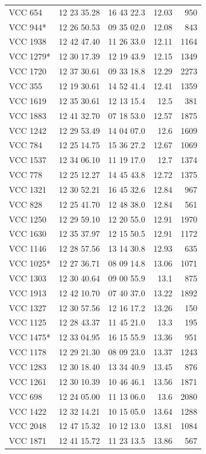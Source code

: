 \documentclass[12pt]{article}
\begin{document}
\begin{table}[!htp]
\begin{minipage}[t]{.45\linewidth}
\begin{tabular}{lrrrr}
VCC 654 &12 23 35.28 &16 43 22.3 &12.03 &950 \\
VCC 944* &12 26 50.53 &09 35 02.0 &12.08 &843 \\
VCC 1938 &12 42 47.40 &11 26 33.0 &12.11 &1164 \\
VCC 1279* &12 30 17.39 &12 19 43.9 &12.15 &1349 \\
VCC 1720 &12 37 30.61 &09 33 18.8 &12.29 &2273 \\
VCC 355 &12 19 30.61 &14 52 41.4 &12.41 &1359 \\
VCC 1619 &12 35 30.61 &12 13 15.4 &12.5 &381 \\
VCC 1883 &12 41 32.70 &07 18 53.0 &12.57 &1875 \\
VCC 1242 &12 29 53.49 &14 04 07.0 &12.6 &1609 \\
VCC 784 &12 25 14.75 &15 36 27.2 &12.67 &1069 \\
VCC 1537 &12 34 06.10 &11 19 17.0 &12.7 &1374 \\
VCC 778 &12 25 12.27 &14 45 43.8 &12.72 &1375 \\
VCC 1321 &12 30 52.21 &16 45 32.6 &12.84 &967 \\
VCC 828 &12 25 41.70 &12 48 38.0 &12.84 &561 \\
VCC 1250 &12 29 59.10 &12 20 55.0 &12.91 &1970 \\
VCC 1630 &12 35 37.97 &12 15 50.5 &12.91 &1172 \\
VCC 1146 &12 28 57.56 &13 14 30.8 &12.93 &635 \\
VCC 1025* &12 27 36.71 &08 09 14.8 &13.06 &1071 \\
VCC 1303 &12 30 40.64 &09 00 55.9 &13.1 &875 \\
VCC 1913 & 12 42 10.70 &07 40 37.0 &13.22 &1892 \\
VCC 1327 & 12 30 57.56 &12 16 17.2 &13.26 &150 \\
VCC 1125 &12 28 43.37 &11 45 21.0 &13.3 &195 \\
VCC 1475* & 12 33 04.95 &16 15 55.9 &13.36 &951 \\
VCC 1178 &12 29 21.30 &08 09 23.0 &13.37 &1243 \\
VCC 1283 & 12 30 18.40 &13 34 40.9 &13.45 &876 \\
VCC 1261 &12 30 10.39 &10 46 46.1 &13.56 &1871 \\
VCC 698 & 12 24 05.00 &11 13 06.0 &13.6 &2080 \\
VCC 1422 & 12 32 14.21 &10 15 05.0 &13.64 &1288 \\
VCC 2048 &12 47 15.32 &10 12 13.0 &13.81 &1084 \\
VCC 1871 & 12 41 15.72 &11 23 13.5 &13.86 &567 \\

\end{tabular}
\end{minipage}
\end{table}
\end{document}
